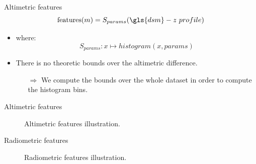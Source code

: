 \documentclass{beamer}
\begin{document}
            \begin{frame}{Altimetric features}
                \begin{equation}\label{eq::feature_vec}
                    \text{features}(m) = S_{params}(\gls{dsm} - z\ profile)
                \end{equation}
                \begin{itemize}[itemsep=5em]
                    \item where:
                    \begin{equation*}
                        S_{params}: x \mapsto histogram(x, params)
                    \end{equation*}
                    \item There is no theoretic bounds over the altimetric difference.
                    \begin{itemize}[font=\color{IGNDarkOrange}]
                        \item[$\Rightarrow$] We compute the bounds over the whole dataset in order to compute the histogram bins.
                    \end{itemize}
                \end{itemize}
            \end{frame}
            \begin{frame}{Altimetric features}
                \begin{figure}

                    \caption{\label{fig::altimetric} Altimetric features illustration.}
                \end{figure}
            \end{frame}
            \begin{frame}{Radiometric features}
                \begin{figure}

                    \caption{\label{fig::radiometric} Radiometric features illustration.}
                \end{figure}
            \end{frame}
\end{document}
